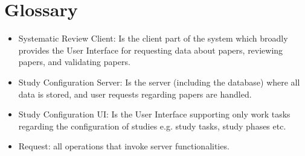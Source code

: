 \section{Glossary}

\begin{itemize}

\item Systematic Review Client: Is the client part of the system which broadly provides the User Interface for requesting data about papers, reviewing papers, and validating papers.
\item Study Configuration Server: Is the server (including the database) where all data is stored, and user requests regarding papers are handled.
\item Study Configuration UI: Is the User Interface supporting only work tasks regarding the configuration of studies e.g. study tasks, study phases etc.
\item Request: all operations that invoke server functionalities. 
\end{itemize}
